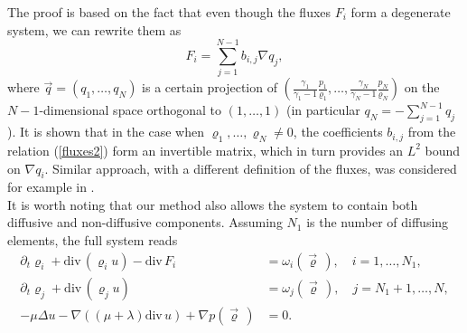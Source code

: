 \documentclass[11pt]{article}
\newcommand{\ddiv}{\mathrm{div\,}}
\numberwithin{equation}{section}
\numberwithin{tw}{section}
\begin{document}
The proof is based on the fact that even though the fluxes $F_i$ form a degenerate system, we can rewrite them as
\begin{equation}\label{fluxes2}
F_i = \sum_{j=1}^{N-1}b_{i,j}\nabla q_j, \end{equation}
where $\vec q=(q_1,\dots,q_N)$ is a certain projection of $\left(\frac{\gamma_1}{\gamma_1-1}\frac{p_1}{\varrho_1},\dots,\frac{\gamma_N}{\gamma_N-1}\frac{p_N}{\varrho_N}\right)$ on the $N-1$-dimensional space orthogonal to $(1,\dots,1)$ (in particular $q_N=-\sum_{j=1}^{N-1}q_j$). It is shown that in the case when $\varrho_1,\dots,\varrho_N\neq 0$, the coefficients $b_{i,j}$ from the relation (\ref{fluxes2}) form an invertible matrix, which in turn provides an $L^2$ bound on $\nabla q_i$.
Similar approach, with a different definition of the fluxes, was considered for example in \cite{bulicek-pokorny,DDGG}. \\


It is worth noting that our method also allows the system to contain both diffusive and non-diffusive components. Assuming $N_1$ is the number of diffusing elements, the full system reads
\begin{equation}\label{diff_nondiff}
    \begin{aligned}
    \partial_t\varrho_{i} + \ddiv(\varrho_{i} u) -\ddiv F_i &= \omega_{i}(\vec\varrho\,), \quad i=1,\dots,N_1, \\
    \partial_t\varrho_j + \ddiv(\varrho_j u) &= \omega_j(\vec\varrho\,), \quad j=N_1+1,\dots,N, \\
   -\mu\Delta u -\nabla((\mu+\lambda)\ddiv u) + \nabla p(\vec\varrho\,) &= 0.
    \end{aligned}
\end{equation}
\end{document}
